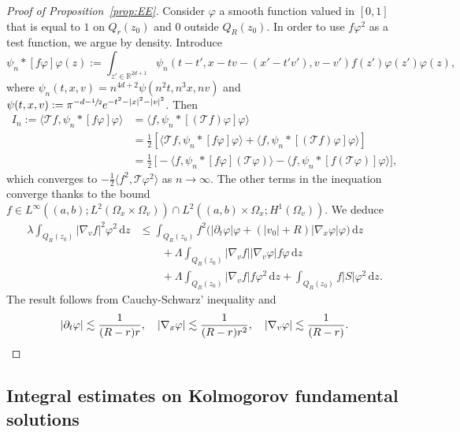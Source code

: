 \documentclass[10pt]{amsart}
\let\mathcal\mathscr
\theoremstyle{definition}
\theoremstyle{remark}
\newcommand\R{{\mathbb R}}
\newcommand{\cT}{\mathcal T}
\newcommand{\dd}{{\, \mathrm d}}
\begin{document}
\begin{proof}[Proof of Proposition~\ref{prop:EE}]
Consider $\varphi$ a smooth function valued in $[0,1]$ that is
equal to $1$ on $Q_r(z_0)$ and $0$ outside $Q_R(z_0)$. In order
to use $f\varphi^2$ as a test function, we argue by
density. Introduce
\begin{equation*}
\psi_n * [f \varphi] \varphi (z) :=
\int_{z'\in\R^{2d+1}} \psi_n \left(t-t',x-tv-(x'-t'v'),v-v'
\right) f(z') \varphi(z') \varphi(z),
\end{equation*}
where $\psi_n(t,x,v)=n^{4d+2} \psi(n^2 t,n^3 x, n v)$ and
$\psi(t,x,v):= \pi^{-d-\sfrac{1}{2}} e^{-t^2-|x|^2-|v|^2}$.
Then
\begin{align*}
I_n:= \big\langle \cT f, \psi_n * [f \varphi] \varphi
\big\rangle
& = \big\langle f, \psi_n * [(\cT f) \varphi] \varphi
\big\rangle \\
& = \frac{1}{2} \left[\big\langle \cT f, \psi_n * [f \varphi] \varphi
\big\rangle + \big\langle f, \psi_n * [(\cT f) \varphi] \varphi
\big\rangle \right] \\
& = \frac{1}{2}\, \bigl[-\big\langle f, \psi_n * [f \varphi] (\cT\varphi)
\big\rangle -\big\langle f, \psi_n * [f (\cT \varphi)] \varphi
\big\rangle \bigr],
\end{align*}
which converges to
$-\frac{1}{2} \big\langle f^2, \cT\varphi^2 \big\rangle$ as $n
\to \infty$. The
other terms in the inequation converge thanks to the bound
$f \in L^\infty ((a,b);L^2 (\Omega_x \times \Omega_v)) \cap L^2
((a,b) \times \Omega_x;H^1(\Omega_v))$. We deduce
\begin{align*}
\lambda \int_{Q_R(z_0)} |\nabla_v f|^2
\varphi^2 \dd z
& \le \int_{Q_R(z_0)} f^2 \Big( |\partial_t \varphi|
\varphi + (|v_0|+R) | \nabla_x \varphi| \varphi \Big) \dd z\\
& \qquad + \Lambda \int_{Q_R(z_0)} |\nabla_v
f| |\nabla_v \varphi| f \varphi \dd z \\
& \qquad + \Lambda
\int_{Q_R(z_0)} |\nabla_v f| f \varphi^2 \dd z +
\int_{Q_R(z_0)} f |S| \varphi^2 \dd z.
\end{align*}
The result follows from Cauchy-Schwarz' inequality
and
\[
|\partial_t \varphi| \lesssim \frac{1}{(R-r)r},\quad
|\nabla_x \varphi| \lesssim \frac{1}{(R-r)r^2},\quad
|\nabla_v \varphi| \lesssim \frac{1}{(R-r)}.\qedhere
\]
\end{proof}

\subsection{Integral estimates on Kolmogorov fundamental
solutions}
\end{document}
